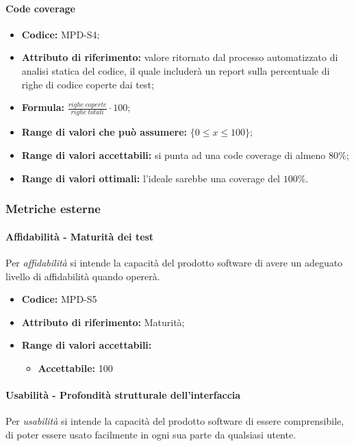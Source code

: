 \paragraph{Code coverage}
\begin{itemize}
    \item \textbf{Codice:} MPD-S4;
    \item \textbf{Attributo di riferimento:} valore ritornato dal processo automatizzato di analisi statica del codice, il quale includerà un report sulla percentuale di righe di codice coperte dai test;
    \item \textbf{Formula:} $\frac{righe \ coperte}{righe \ totali} \cdot 100$;
    \item \textbf{Range di valori che può assumere:} $\{0 \leq x \leq 100 \}$;
    \item \textbf{Range di valori accettabili:} si punta ad una code coverage di almeno $80\%$;
    \item \textbf{Range di valori ottimali:} l'ideale sarebbe una coverage del $100\%$.
\end{itemize}


\subsubsection{Metriche esterne}

\paragraph{Affidabilità - Maturità dei test}
Per \textit{affidabilità} si intende la capacità del prodotto software di avere un adeguato livello di affidabilità quando opererà.

\begin{itemize}
    \item \textbf{Codice:}  MPD-S5
    \item \textbf{Attributo di riferimento:} Maturità;
    \item \textbf{Range di valori accettabili:}
    \begin{itemize}
        \item \textbf{Accettabile:} 100%
       
    \end{itemize}
\end{itemize}


\paragraph{Usabilità - Profondità strutturale dell'interfaccia}
Per \textit{usabilità} si intende la capacità del prodotto software di essere comprensibile, di poter essere usato facilmente in ogni sua parte da qualsiasi utente.

